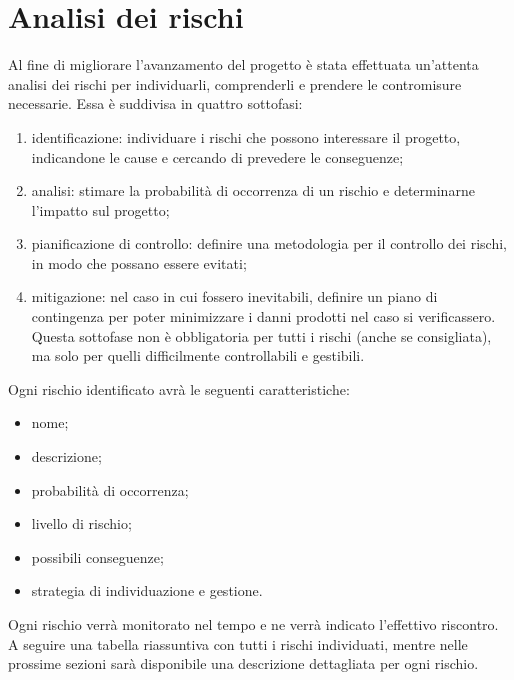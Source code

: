 \documentclass[../PianoProgetto.tex]{subfiles}
\begin{document}
\section{Analisi dei rischi}

	Al fine di migliorare l'avanzamento del progetto è stata effettuata un'attenta analisi dei rischi per individuarli, comprenderli e prendere le contromisure necessarie. Essa è suddivisa in quattro sottofasi:
	\begin{enumerate}
	\item identificazione: individuare i rischi che possono interessare il progetto, indicandone le cause e cercando di prevedere le conseguenze;
	\item analisi: stimare la probabilità di occorrenza di un rischio e determinarne l'impatto sul progetto;
	\item pianificazione di controllo: definire una metodologia per il controllo dei rischi, in modo che possano essere evitati;
	\item mitigazione: nel caso in cui fossero inevitabili, definire un piano di contingenza per poter minimizzare i danni prodotti nel caso si verificassero. Questa sottofase non è obbligatoria per tutti i rischi (anche se consigliata), ma solo per quelli difficilmente controllabili e gestibili.
	\end{enumerate}
	Ogni rischio identificato avrà le seguenti caratteristiche: 
		\begin{itemize}
			\item nome;
			\item descrizione; 
			\item probabilità di occorrenza;
			\item livello di rischio;
			\item possibili conseguenze;
			\item strategia di individuazione e gestione. 
		\end{itemize}	
	Ogni rischio verrà monitorato nel tempo e ne verrà indicato l'effettivo riscontro. A seguire una tabella riassuntiva con tutti i rischi individuati, mentre nelle prossime sezioni sarà disponibile una descrizione dettagliata per ogni rischio.
		
	\newpage
	
\end{document}
